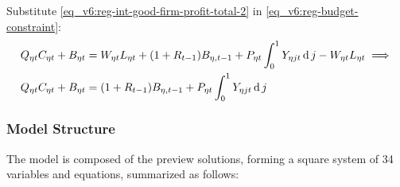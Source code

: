 \documentclass[../thesis.tex]{subfiles}
\begin{document}
Substitute \ref{eq_v6:reg-int-good-firm-profit-total-2} in \ref{eq_v6:reg-budget-constraint}:
\begin{align}
	Q_{\eta t} C_{\eta t} + B_{\eta t} &= W_{\eta t} L_{\eta t} + (1 + R_{t-1}) B_{\eta,t-1} + P_{\eta t} \int_{0}^{1} Y_{\eta jt} \operatorname{d} j - W_{\eta t} L_{\eta t} \implies \nonumber \\
	Q_{\eta t} C_{\eta t} + B_{\eta t} &= (1 + R_{t-1}) B_{\eta,t-1} + P_{\eta t} \int_{0}^{1} Y_{\eta jt} \operatorname{d} j \label{eq_v6:reg-budget-constraint-2}
\end{align}
 

\begin{comment}

\begin{align}
	& \text{where:} \quad Y_{\eta t} = C_{\eta 1 t} + C_{\eta 2 t} + I_{\eta t} %
	L_{\eta t} &= \int_{0}^{1} L_{\eta jt} \dif j %
\end{align}

\end{comment}

\newpage


\subsubsection{Model Structure}

The model is composed of the preview solutions, forming a square system of 34 variables and equations, summarized as follows:
\end{document}
